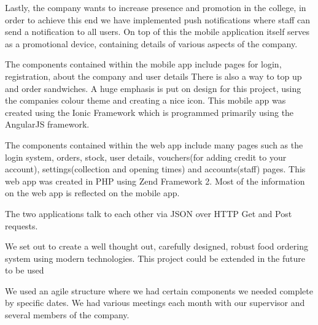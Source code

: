 Lastly, the company wants to increase presence and promotion in the college, in order to achieve this end we have implemented push notifications where staff can send a notification to all users. On top of this the mobile application itself serves as a promotional device, containing details of various aspects of the company.
\linebreak

The components contained within the mobile app include pages for login, registration, about the company and user details There is also a way to top up and order sandwiches.
A huge emphasis is put on design for this project, using the companies colour theme and creating a nice icon.
This mobile app was created using the Ionic Framework which is programmed primarily using the AngularJS framework.

The components contained within the web app include many pages such as the login system, orders, stock, user details, vouchers(for adding credit to your account), settings(collection and opening times) and accounts(staff) pages.
This web app was created in PHP using Zend Framework 2.
Most of the information on the web app is reflected on the mobile app.

The two applications talk to each other via JSON over HTTP Get and Post requests. 

We set out to create a well thought out, carefully designed, robust food ordering system using modern technologies.
This project could be extended in the future to be used 
\linebreak




We used an agile structure where we had certain components we needed complete by specific dates.
We had various meetings each month with our supervisor and several members of the company.







